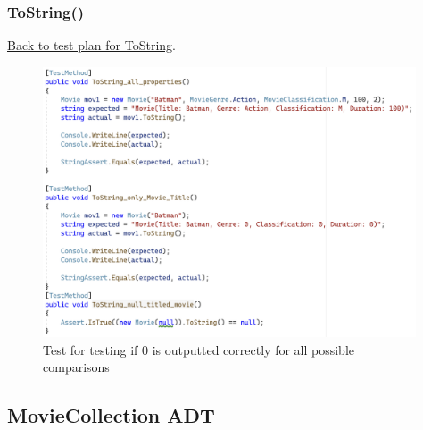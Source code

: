 \documentclass[a4paper]{article}
\begin{document}
\subsubsection{ToString{()}}
\hyperlink{subsubsection.3.1.2}{Back to test plan for ToString}.
\begin{figure}[H]
    \includegraphics[height=8cm]{data/ToString-tests.png}
    \caption{Test for testing if $0$ is outputted correctly for all possible comparisons}
\end{figure}


\subsection{MovieCollection ADT}
\end{document}
